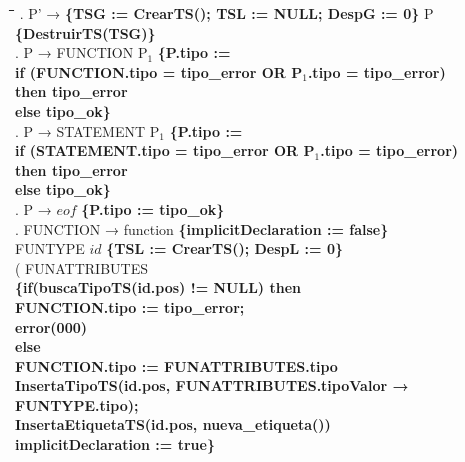 \begin{tabbing}
    \hspace{1cm}\=\hspace{3cm}\=\hspace{1cm}\=\hspace{1cm}\=\hspace{1cm}\=\kill
    . P' → \textbf{\{TSG := CrearTS(); TSL := NULL; DespG := 0\}} P \textbf{\{DestruirTS(TSG)\}}\\
    . P → FUNCTION P$_1$ \textbf{\{P.tipo := }\\
    \>              \> \textbf{if (FUNCTION.tipo = tipo\_error OR P$_1$.tipo = tipo\_error)}\\
    \>              \>          \> \textbf{then tipo\_error}\\
    \>              \> \textbf{else tipo\_ok\}}\\
    . P → STATEMENT P$_1$ \textbf{\{P.tipo := }\\
    \>              \> \textbf{if (STATEMENT.tipo = tipo\_error OR P$_1$.tipo = tipo\_error)}\\
    \>              \>          \> \textbf{then tipo\_error}\\
    \>              \> \textbf{else tipo\_ok\}}\\
    . P → $eof$ \textbf{\{P.tipo := tipo\_ok\}}\\
    . FUNCTION → \>function \textbf{\{implicitDeclaration := false\}}\\
    \>              \> FUNTYPE $id$ \textbf{\{TSL := CrearTS(); DespL := 0\}} \\
    \>              \>( FUNATTRIBUTES\\
    \>              \> \textbf{\{if(buscaTipoTS(id.pos) != NULL) then}\\
    \>              \>          \> \textbf{FUNCTION.tipo := tipo\_error;}\\
    \>              \>          \> \textbf{error(000)}\\
    \>              \> \textbf{ else}\\
    \>              \>          \> \textbf{FUNCTION.tipo := FUNATTRIBUTES.tipo}\\
    \>              \>          \> \textbf{InsertaTipoTS(id.pos, FUNATTRIBUTES.tipoValor → FUNTYPE.tipo);}\\
    \>              \>          \> \textbf{InsertaEtiquetaTS(id.pos, nueva\_etiqueta())}\\
    \>              \>\textbf{implicitDeclaration := true\}}\\

\end{tabbing}
